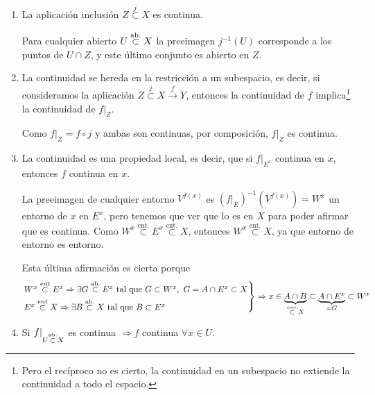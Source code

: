 \begin{obs}
\begin{enumerate}
    \item La aplicación inclusión $Z \stackrel{j}{\subset} X$ es continua.
    \begin{demo}
     Para cualquier abierto $U \stackrel{\text{ab.}}{\subset} X$ la preeimagen $j^{-1}\left( U \right)$ corresponde a los puntos de $U \cap Z$, y este último conjunto es abierto en $Z$.
    \end{demo}

    \item La continuidad se hereda en la restricción a un subespacio, es decir, si consideramos la aplicación $Z \stackrel{j}{\subset} X \xrightarrow{f} Y$, entonces la continuidad de $f$ implica\footnote{Pero el recíproco no es cierto, la continuidad en un subespacio no extiende la continuidad a todo el espacio.} la continuidad de $f|_Z$.
    \begin{demo}
    Como $f|_Z = f \circ j$ y ambas son continuas, por composición, $f|_Z$ es continua.
    \end{demo}

    \item La continuidad es una propiedad local, es decir, que si $f|_{E^x}$ continua en $x$, entonces $f$ continua en $x$.
    \begin{demo}
	La preeimagen de cualquier entorno $V^{f\left( x \right)}$ es $\left( f|_{E} \right)^{-1} \left( V^{f\left( x \right)} \right) = W^x$ un entorno de $x$ en $E^x$, pero tenemos que ver que lo es en $X$ para poder afirmar que es continua.
	Como $W^x \stackrel{\text{ent.}}{\subset} E^x \stackrel{\text{ent.}}{\subset} X$, entonces $W^x \stackrel{\text{ent.}}{\subset}X$, ya que entorno de entorno es entorno.
	
	Esta última afirmación es cierta porque 
        \[
        \begin{rcases}
           	W^x \stackrel{ent}{\subset} E^x \Rightarrow \exists G \stackrel{\text{ab.}}{\subset} E^x \mbox{ tal que }G \subset W^x, \ G = A \cap E^x \subset X\\ 
            E^x \stackrel{ent}{\subset} X \Rightarrow \exists B \stackrel{\text{ab.}}{\subset} X \mbox{ tal que } B \subset E^x
        \end{rcases} \Rightarrow x \in \underbrace{A \cap B}_{\stackrel{\text{cerr.}}{\subset} X} \subset \underbrace{A \cap E^x}_{= G}  \subset W^x
        \]
    \end{demo}

    \item Si $f|_{U \stackrel{\text{ab.}}{\subset} X}$ es continua $\Rightarrow f$ continua $\forall x \in U$.


\end{enumerate}
\end{obs}
